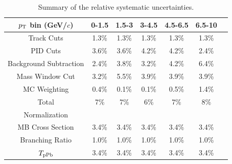 \begin{table}[!h]
  \centering
  \begin{tabular}{ccccccc}\\ \hline
    $p_{\rm{T}}$ bin (GeV/$c$)  & 0-1.5 & 1.5-3 & 3-4.5 & 4.5-6.5 & 6.5-10\\ \hline
    Track Cuts                 &  1.3\% &  1.3\%     &  1.3\%  &  1.3\%  & 1.3\%       \\
    PID Cuts                   &  3.6\% &  3.6\%     &  4.2\%  &  4.2\%  & 2.4\%                   \\ \hline
    Background Subtraction      &  2.4\% &  3.8\%     &  3.2\%  &  4.2\%  & 6.4\%            \\ 
    Mass Window Cut            &  3.2\% &  5.5\%     &  3.9\%  &  3.9\%  & 3.9\%                   \\ \hline 
    MC Weighting               &  0.4\% &  0.1\%     &  0.1\%  &  0.5\%  & 1.4\%                         \\ \hline
    Total                      & 7\%   & 7\% &  6\%& 7\% & 8\% \\     \hline
    Normalization & & & & & \\  \hline
    MB Cross Section  & 3.4\% & 3.4\% & 3.4\% & 3.4\% & 3.4\% \\
   Branching Ratio & 1.0\%& 1.0\%& 1.0\%& 1.0\%& 1.0\% \\	
	$T_{\rm{pPb}}$ & 3.4\% & 3.4\% & 3.4\% & 3.4\% & 3.4\% \\ \hline
  \end{tabular}
  \caption{Summary of the relative systematic uncertainties.}
  \label{table_4_sys}
\end{table}









